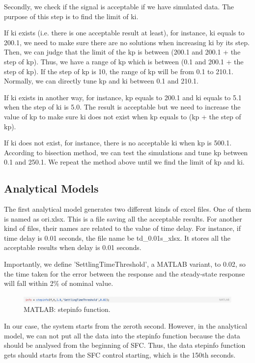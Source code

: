 Secondly, we check if the signal is acceptable if we have simulated data. The purpose of this step is to find the limit of ki. 

If ki exists (i.e. there is one acceptable result at least), for instance, ki equals to 200.1, we need to make sure there are no solutions when increasing ki by its step. Then, we can judge that the limit of the kp is between (200.1 and 200.1 + the step of kp). Thus, we have a range of kp which is between (0.1 and 200.1 + the step of kp). If the step of kp is 10, the range of kp will be from 0.1 to 210.1. Normally, we can directly tune kp and ki between 0.1 and 210.1. 

If ki exists in another way, for instance, kp equals to 200.1 and ki equals to 5.1 when the step of ki is 5.0. The result is acceptable but we need to increase the value of kp to make sure ki does not exist when kp equals to (kp + the step of kp). 

If ki does not exist, for instance, there is no acceptable ki when kp is 500.1. According to bisection method, we can test the simulations and tune kp between 0.1 and 250.1. We repeat the method above until we find the limit of kp and ki. 


\subsection{Analytical Models} %
\label{subsection3.4.2}

The first analytical model generates two different kinds of excel files. One of them is named as ori.xlsx. This is a file saving all the acceptable results. For another kind of files, their names are related to the value of time delay. For instance, if time delay is 0.01 seconds, the file name be td\_0.01s\_xlsx. It stores all the acceptable results when delay is 0.01 seconds. 

Importantly, we define 'SettlingTimeThreshold', a MATLAB variant, to 0.02, so the time taken for the error between the response and the steady-state response will fall within 2\% of nominal value. 

\begin{figure}[htbp]
\centering
\includegraphics[width = .999\textwidth]{figure/3_4_2_code4.png}
\caption{MATLAB: stepinfo function.}
\label{3_4_2_code4}
\end{figure}

In our case, the system starts from the zeroth second. However, in the analytical model, we can not put all the data into the stepinfo function because the data should be analysed from the beginning of SFC. Thus, the data stepinfo function gets should starts from the SFC control starting, which is the 150th seconds.  


